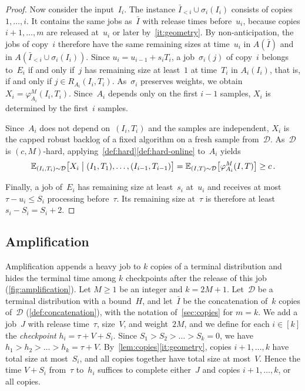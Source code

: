 \documentclass[11pt,letterpaper]{article}
\theoremstyle{definition}
\theoremstyle{remark}
\newcommand{\E}{\mathbb{E}}
\newcommand{\cD}{\mathcal{D}}
\begin{document}
\begin{proof}
Now consider the input~$I_i$. The instance $\bar I_{<i}\cup\sigma_i(I_i)$ consists of copies $1,\dots,i$. It contains the same jobs as~$\bar I$ with release times before~$u_i$, because copies $i+1,\dots,m$ are released at~$u_i$ or later by~\ref{it:geometry}. By non-anticipation, the jobs of copy~$i$ therefore have the same remaining sizes at time~$u_i$ in $A(\bar I)$ and in $A(\bar I_{<i}\cup\sigma_i(I_i))$. Since $u_i=u_{i-1}+s_iT_i$, a job~$\sigma_i(j)$ of copy~$i$ belongs to~$E_i$ if and only if~$j$ has remaining size at least~$1$ at time~$T_i$ in $A_i(I_i)$, that is, if and only if $j\in R_{A_i}(I_i,T_i)$. As~$\sigma_i$ preserves weights, we obtain $X_i=\varphi_{A_i}^M(I_i,T_i)$. Since~$A_i$ depends only on the first $i-1$ samples, $X_i$ is determined by the first~$i$ samples.

Since~$A_i$ does not depend on~$(I_i,T_i)$ and the samples are independent, $X_i$ is the capped robust backlog of a fixed algorithm on a fresh sample from~$\cD$. As~$\cD$ is $(c,M)$-hard, applying~\cref{def:hard}\ref{def:hard-online} to~$A_i$ yields
\begin{equation*}
  \E_{(I_i,T_i)\sim\cD}\bigl[X_i\bigm|(I_1,T_1),\dots,(I_{i-1},T_{i-1})\bigr]
  =\E_{(I,T)\sim\cD}\bigl[\varphi_{A_i}^M(I,T)\bigr]
  \ge c\,.
\end{equation*}

Finally, a job of~$E_i$ has remaining size at least~$s_i$ at~$u_i$ and receives at most $\tau-u_i\le S_i$ processing before~$\tau$. Its remaining size at~$\tau$ is therefore at least $s_i-S_i=S_i+2$.
\end{proof}

\subsection{Amplification}\label{sec:amplification}

Amplification appends a heavy job to $k$ copies of a terminal distribution and hides the terminal time among $k$ checkpoints after the release of this job (\cref{fig:amplification}). Let $M\ge1$ be an integer and $k=2M+1$. Let~$\cD$ be a terminal distribution with a bound~$H$, and let~$\bar I$ be the concatenation of~$k$ copies of~$\cD$ (\cref{def:concatenation}), with the notation of~\cref{sec:copies} for $m=k$. We add a job~$J$ with release time~$\tau$, size~$V$, and weight~$2M$, and we define for each $i\in[k]$ the \emph{checkpoint} $h_i=\tau+V+S_i$. Since $S_1>S_2>\dots>S_k=0$, we have $h_1>h_2>\dots>h_k=\tau+V$. By~\cref{lem:copies}\ref{it:geometry}, copies $i+1,\dots,k$ have total size at most~$S_i$, and all copies together have total size at most~$V$. Hence the time $V+S_i$ from~$\tau$ to~$h_i$ suffices to complete either~$J$ and copies $i+1,\dots,k$, or all copies.
\end{document}

